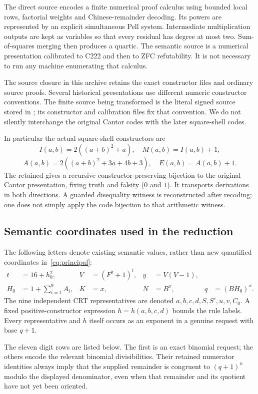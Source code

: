 \documentclass[10pt,letterpaper]{article}
\theoremstyle{definition}\newtheorem{definition}[theorem]{Definition}
\begin{document}
The direct source encodes a finite numerical proof calculus using bounded
local rows, factorial weights and Chinese-remainder decoding. Its powers
are represented by an explicit simultaneous Pell system. Intermediate
multiplication outputs are kept as variables so that every residual has
degree at most two. Sum-of-squares merging then produces a quartic.
The semantic source is a numerical presentation calibrated to C222 and
then to ZFC refutability. It is not necessary to run any machine enumerating
that calculus.

The source closure in this archive retains the exact constructor files and
ordinary source proofs. Several historical presentations use different
numeric constructor conventions. The finite source being transformed is
the literal signed source stored in ;
its constructor and calibration files fix that convention. We do not
silently interchange the original Cantor codes with the later square-shell
codes.

In particular the actual square-shell constructors are
\[
 I(a,b)=2((a+b)^2+a),\quad M(a,b)=I(a,b)+1,
\]
\[
 A(a,b)=2((a+b)^2+3a+4b+3),\quad E(a,b)=A(a,b)+1.
\]
The retained  gives a recursive
constructor-preserving bijection to the original Cantor presentation,
fixing truth and falsity ($0$ and $1$). It transports derivations in both
directions. A guarded disequality witness is reconstructed after recoding;
one does not simply apply the code bijection to that arithmetic witness.

\subsection{Semantic coordinates used in the reduction}

The following letters denote existing semantic values, rather than new
quantified coordinates in~\eqref{eq:principal}:
\begin{align}
 t&=16+h_0^2,& V&=(F^2+1)^t,& y&=V(V-1),\label{eq:front1}\\
 H_0&=1+\sum_{i=1}^{9} A_i,&K&=x,&N&=B^x,&q&=(BH_0)^x.\label{eq:front2}
\end{align}
The nine independent CRT representatives are denoted
$a,b,c,d,S,S',u,v,C_0$. A fixed positive-constructor expression
$h=h(a,b,c,d)$ bounds the rule labels. Every representative and $h$ itself
occurs as an exponent in a genuine request with base $q+1$.

The eleven digit rows are listed below. The first is an exact binomial
request; the others encode the relevant binomial divisibilities.
Their retained numerator identities always imply that the supplied
remainder is congruent to $(q+1)^n$ modulo the displayed denominator,
even when that remainder and its quotient have not yet been oriented.
\end{document}
